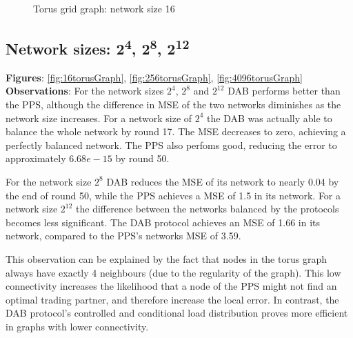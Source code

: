 \begin{figure}[H]
    \centering
    \scalebox{1.5}{}
    \caption{Torus grid graph: network size 16}
    \label{fig:torusGraph}
\end{figure}

\subsection{Network sizes: 2\textsuperscript{4}, 2\textsuperscript{8}, 2\textsuperscript{12}}
\textbf{Figures}: \ref{fig:16torusGraph}, \ref{fig:256torusGraph}, \ref{fig:4096torusGraph}\\
\textbf{Observations}: For the network sizes $2^{4}$, $2^{8}$ and $2^{12}$ DAB performs better than the PPS, although the difference in MSE of the two networks diminishes as the network size increases. For a network size of $2^{4}$ the DAB was actually able to balance the whole network by round 17. The MSE decreases to zero, achieving a perfectly balanced network. The PPS also perfoms good, reducing the error to approximately $6.68e-15$ by round 50.

For the network size $2^{8}$ DAB reduces the MSE of its network to nearly 0.04 by the end of round 50, while the PPS achieves a MSE of 1.5 in its network. For a network size $2^{12}$ the difference between the networks balanced by the protocols becomes less significant. The DAB protocol achieves an MSE of 1.66 in its network, compared to the PPS's networks MSE of 3.59.

This observation can be explained by the fact that nodes in the torus graph always have exactly 4 neighbours (due to the regularity of the graph). This low connectivity increases the likelihood that a node of the PPS might not find an optimal trading partner, and therefore increase the local error. In contrast, the DAB protocol's controlled and conditional load distribution proves more efficient in graphs with lower connectivity.

